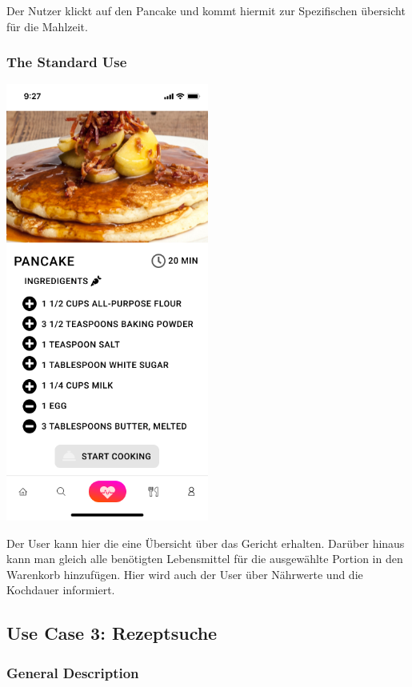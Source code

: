 \documentclass[12pt]{article}
\theoremstyle{definition}
\begin{document}
Der Nutzer klickt auf den Pancake und kommt hiermit zur Spezifischen übersicht für die Mahlzeit.
\subsubsection{The Standard Use}
\begin{center}
    \includegraphics[width=0.5\textwidth]{res/images/Breakfast.png}
\end{center}


Der User kann hier die eine Übersicht über das Gericht erhalten. Darüber hinaus kann man gleich alle benötigten Lebensmittel für die ausgewählte Portion in den Warenkorb hinzufügen. Hier wird auch der User über Nährwerte und die Kochdauer informiert.




\pagebreak

\subsection{Use Case 3: Rezeptsuche}
\subsubsection{General Description}
\end{document}

